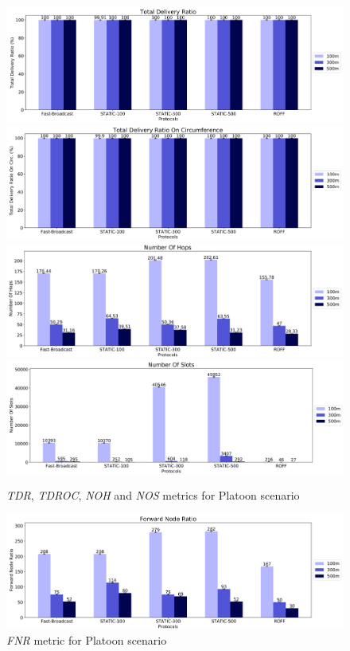		\begin{figure}[H]
			\centering
			\includegraphics[width=1.1\textwidth]{immagini/platoon-15km/tdr}
			\includegraphics[width=1.1\textwidth]{immagini/platoon-15km/tdroc}
			\includegraphics[width=1.1\textwidth]{immagini/platoon-15km/noh}
			\includegraphics[width=1.1\textwidth]{immagini/platoon-15km/nos}
			\caption{\textit{TDR}, \textit{TDROC}, \textit{NOH} and \textit{NOS} metrics for Platoon scenario}
			\label{fig:metric-platoon-15km-1}
		\end{figure}

		\begin{figure}[H]
			\centering
			\includegraphics[width=1.1\textwidth]{immagini/platoon-15km/fnr}
			\caption{\textit{FNR} metric for Platoon scenario }
			\label{fig:metric-platoon-15km-2}
		\end{figure}
	
